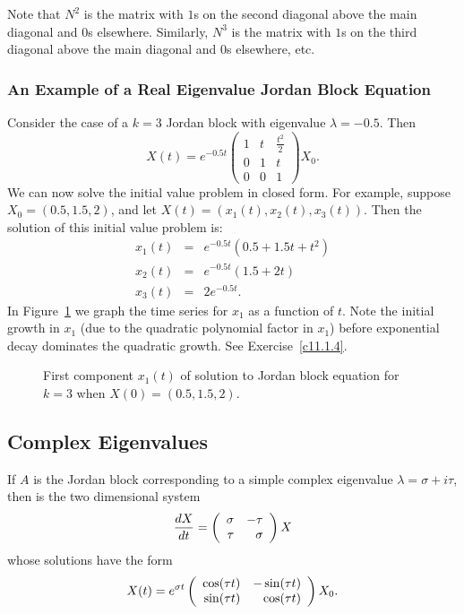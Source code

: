 Note that $N^2$ is the matrix with $1$s on the second diagonal above the main
diagonal and $0$s elsewhere.  Similarly, $N^3$ is the matrix with $1$s on the 
third diagonal above the main diagonal and $0$s elsewhere, etc.
 

\subsubsection*{An Example of a Real Eigenvalue Jordan Block Equation}

Consider the case of a $k=3$ Jordan block with eigenvalue $\lambda=-0.5$.  
Then
\[
X(t) = e^{-0.5t} \left(\begin{array}{ccc} 1 & t & \frac{t^2}{2} \\
0 & 1 & t \\ 0 & 0 & 1 \end{array}\right)X_0.
\]
We can now solve the initial value problem
 in closed form.  For example,
suppose $X_0=(0.5,1.5,2)$, and let $X(t)=(x_1(t),x_2(t),x_3(t))$.  Then 
the solution of this initial value problem is:
\begin{equation}  \label{E:x1examp}
\begin{array}{rcl}
x_1(t) & = & e^{-0.5t}(0.5 + 1.5t + t^2) \\
x_2(t) & = & e^{-0.5t}(1.5 + 2t) \\
x_3(t) & = & 2e^{-0.5t}.
\end{array}
\end{equation}
In Figure~\ref{F:Jordan} we graph the time series for $x_1$ as a
function of $t$.  Note the initial growth in $x_1$ (due to the quadratic 
polynomial factor in $x_1$) before exponential decay 
dominates the quadratic growth.  See Exercise~\ref{c11.1.4}.

\begin{figure}[htb]
     \centerline{%
     }
     \caption{First component $x_1(t)$ of solution to
	Jordan block equation for $k=3$ when $X(0)=(0.5,1.5,2)$.}
     \label{F:Jordan}
\end{figure}

\subsection*{Complex Eigenvalues}

If $A$ is the Jordan block corresponding to a simple complex eigenvalue
$\lambda=\sigma+i\tau$, then  is the two dimensional system 
\[
\frac{dX}{dt}=\left(\begin{array}{rr} \sigma & -\tau\\ \tau &\sigma\end{array}\right) X
\]
whose solutions have the form 
\[
X(t)=e^{\sigma t}\left(\begin{array}{rr} \cos(\tau t) & -\sin(\tau t)\\ \sin(\tau t) &\cos(\tau t)\end{array}\right) X_0.
\]

